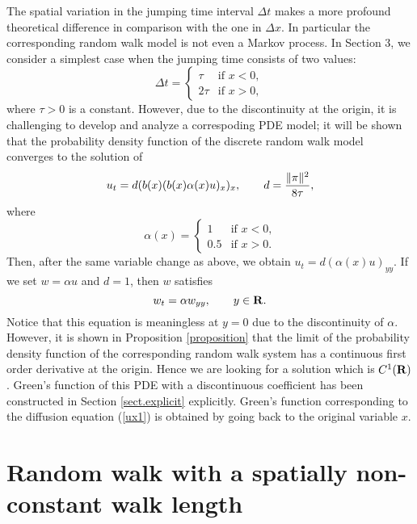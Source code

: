 \documentclass[11pt]{amsart}
\def\R{{\bf R}}
\def\R{\mathbb{R}}
\def\R{{\bf R}}
\begin{document}
The spatial variation in the jumping time interval $\Delta t$ makes a more profound theoretical difference in comparison with the one in $\Delta x$. In particular the corresponding random walk model is not even a Markov process. In Section 3, we consider a simplest case when the jumping time consists of two values:
$$
\Delta t=
\begin{cases}
\tau & \text{if $x<0$,}\\
2\tau & \text{if $x>0$},
\end{cases}
$$
where $\tau>0$ is a constant. However, due to the discontinuity at the origin, it is challenging to develop and analyze a correspoding PDE model; it will be shown that the probability density function of the discrete random walk model converges to the solution of
\begin{equation}\label{ux1}
u_t=d(b(x)(b(x)\alpha(x)u)_x)_x,\qquad d={\|\pi\|^2\over 8\tau},
\end{equation}
where
$$
\alpha(x)=\begin{cases}
1 & \text{if $x<0$,}\\
0.5& \text{if $x>0$}.
\end{cases}
$$
Then, after the same variable change as above, we obtain $u_t=d(\alpha(x)u)_{yy}$. If we set $w=\alpha u$ and $d=1$, then $w$ satisfies
$$
w_t=\alpha w_{yy},\qquad y\in\R.
$$
Notice that this equation is meaningless at $y=0$ due to the discontinuity of $\alpha$. However, it is shown in Proposition \ref{proposition} that the limit of the probability density function of the corresponding random walk system has a continuous first order derivative at the origin. Hence we are looking for a solution which is $C^1(\R)$. Green's function of this PDE with a discontinuous coefficient has been constructed in Section \ref{sect.explicit} explicitly. Green's function corresponding to the diffusion equation (\ref{ux1}) is obtained by going back to the original variable $x$.


\section{Random walk with a spatially non-constant walk length}
\end{document}
